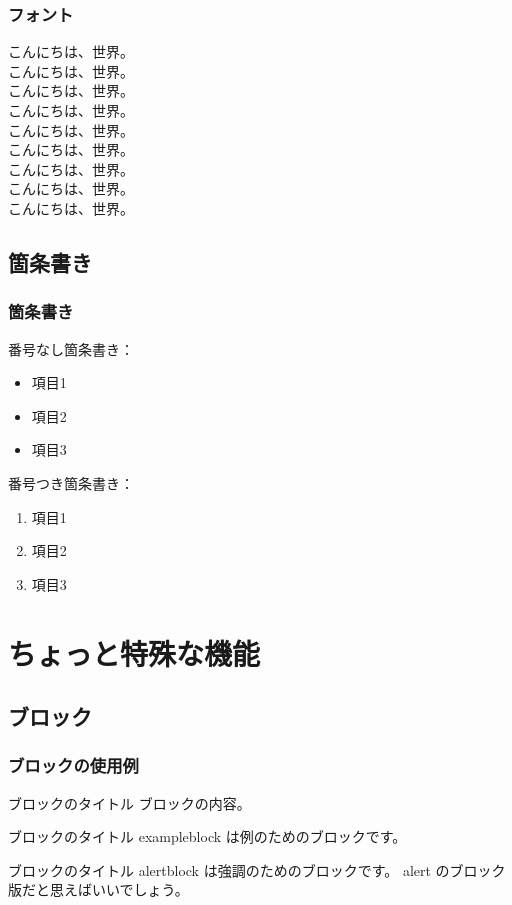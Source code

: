 \documentclass[dvipdfmx,cjk,xcolor=dvipsnames,envcountsect,notheorems,12pt]{beamer}
\theoremstyle{definition}
\begin{document}
\begin{frame}
  \frametitle{フォント}
  {\scriptsize こんにちは、世界。}\\
  {\footnotesize こんにちは、世界。}\\
  {\small こんにちは、世界。}\\
  こんにちは、世界。\\%
  {\large こんにちは、世界。}\\
  {\Large こんにちは、世界。}\\
  {\LARGE こんにちは、世界。}\\
  {\Huge こんにちは、世界。}
  \vfill%
  \\%
  \alert{こんにちは、世界。}%
\end{frame}

\subsection{箇条書き}

\begin{frame}
  \frametitle{箇条書き}
  番号なし箇条書き：
  \begin{itemize}
  \item 項目1
  \item 項目2
  \item 項目3
  \end{itemize}
  番号つき箇条書き：
  \begin{enumerate}
  \item 項目1
  \item 項目2
  \item 項目3
  \end{enumerate}
\end{frame}

\section{ちょっと特殊な機能}

\subsection{ブロック}

\begin{frame}
  \frametitle{ブロックの使用例}
  \begin{block}{ブロックのタイトル}
    ブロックの内容。
  \end{block}
  \vfill
  \begin{exampleblock}{ブロックのタイトル}
    exampleblock は例のためのブロックです。
  \end{exampleblock}
  \vfill
  \begin{alertblock}{ブロックのタイトル}
    alertblock は強調のためのブロックです。
    alert のブロック版だと思えばいいでしょう。
  \end{alertblock}
\end{frame}
\end{document}
